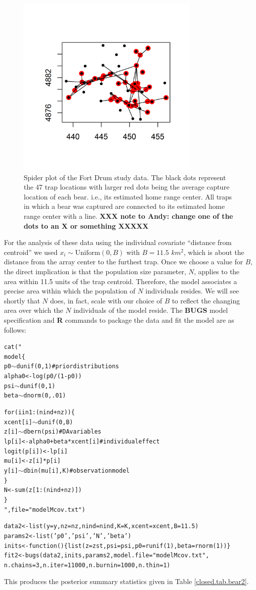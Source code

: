 \begin{figure}[ht]
\centering
\includegraphics[height=3.5in,width=3.5in]{Ch4-Closed/figs/bear_spiderplot.png}
\caption{Spider plot of the Fort Drum study data.
The black dots represent the 47 trap locations with larger red dots
being the average capture location of each bear. i.e., its estimated home
range center. All traps in which a bear was captured are connected to
its estimated home range center with a line.
{\bf XXX note to Andy: change one of the dots to an X or something
  XXXXX }
}
\label{closed.fig.spiderplot}
\end{figure}

For the analysis of these data using the individual covariate
``distance from centroid'' we used $x_{i} \sim \mbox{Uniform}(0,B)$
with $B = 11.5$ $km^2$, which is about the distance from the array
center to the furthest trap.  Once we choose a value for $B$, the direct
implication is that the population size parameter, $N$, applies to the area
within 11.5 units of the trap centroid. Therefore, the model
associates a precise area within which the population of $N$ individuals
resides. 
We will see shortly that $N$
does, in fact, scale with our choice of $B$ to reflect the changing
area over which the $N$ individuals of the model reside.  The {\bf
  BUGS} model specification and {\bf R} commands to package the data
and fit the model are as follows:
{\small
\begin{alltt}
cat("
model\{
p0\( \sim \)dunif(0,1)            # prior distributions
alpha0 <- log(p0/(1-p0))
psi\( \sim \)dunif(0,1)
beta\( \sim \)dnorm(0,.01)

for(i in 1:(nind+nz))\{
  xcent[i]\( \sim \)dunif(0,B)
  z[i]\( \sim \)dbern(psi)        # DA variables
  lp[i] <- alpha0 + beta*xcent[i] # individual effect
  logit(p[i]) <- lp[i]
  mu[i] <- z[i]*p[i]
  y[i]\( \sim \)dbin(mu[i],K)     #  observation model
 \}
N<-sum(z[1:(nind+nz)])
\}
",file="modelMcov.txt")

data2 <- list(y=y,nz=nz,nind=nind,K=K,xcent=xcent,B=11.5)
params2 <- list('p0','psi','N','beta')
inits <- function() \{list(z=zst, psi=psi, p0=runif(1),beta=rnorm(1) ) \}
fit2 <-  bugs(data2, inits, params2, model.file="modelMcov.txt",
         n.chains=3, n.iter=11000, n.burnin=1000, n.thin=1)
\end{alltt}
}
This produces the posterior summary statistics given in Table \ref{closed.tab.bear2}.

